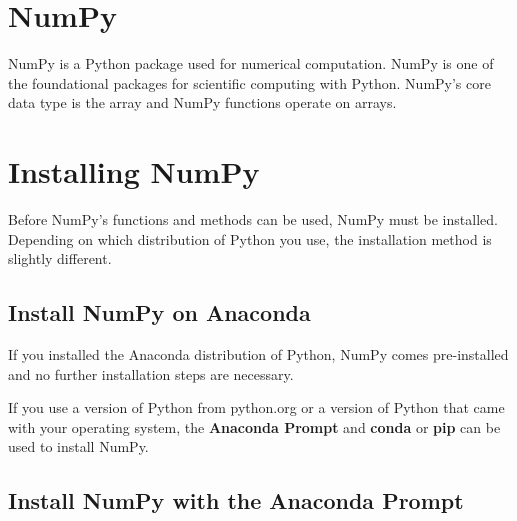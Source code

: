 \documentclass{book}
\begin{document}
    




    
        \hypertarget{numpy}{%
\section{NumPy}\label{numpy}}
    




    
        NumPy is a Python package used for numerical computation. NumPy is one
of the foundational packages for scientific computing with Python.
NumPy's core data type is the array and NumPy functions operate on
arrays.
    




    
        \hypertarget{installing-numpy}{%
\section{Installing NumPy}\label{installing-numpy}}
    




    
        Before NumPy's functions and methods can be used, NumPy must be
installed. Depending on which distribution of Python you use, the
installation method is slightly different.
    




    
        \hypertarget{install-numpy-on-anaconda}{%
\subsection{Install NumPy on Anaconda}\label{install-numpy-on-anaconda}}

If you installed the Anaconda distribution of Python, NumPy comes
pre-installed and no further installation steps are necessary.

If you use a version of Python from python.org or a version of Python
that came with your operating system, the \textbf{Anaconda Prompt} and
\textbf{conda} or \textbf{pip} can be used to install NumPy.
    




    
        \hypertarget{install-numpy-with-the-anaconda-prompt}{%
\subsection{Install NumPy with the Anaconda
Prompt}\label{install-numpy-with-the-anaconda-prompt}}
\end{document}
